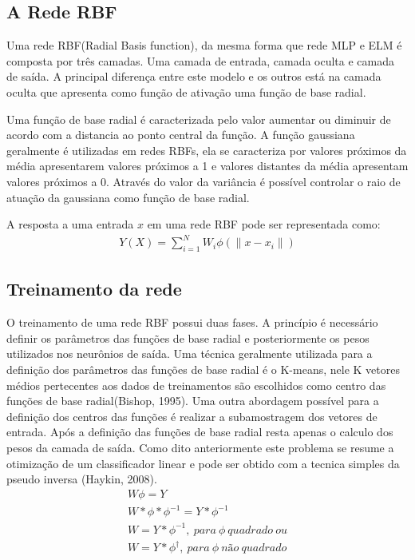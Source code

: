\documentclass[
	article,			%
	11pt,				%
	oneside,			%
	a4paper,			%
	english,			%
	brazil,				%
	sumario=tradicional
	]{abntex2}
\begin{document}
\subsection{A Rede RBF}
Uma rede RBF(Radial Basis function), da mesma forma que rede MLP e ELM é
composta por três camadas.
Uma camada de entrada, camada oculta e camada de saída. A principal diferença entre
este modelo e os outros está na camada oculta que apresenta como função de
ativação uma função de base radial.

Uma função de base radial é caracterizada pelo valor aumentar ou
diminuir de acordo com a distancia ao ponto central da função. A função
gaussiana geralmente é utilizadas em redes RBFs, ela se caracteriza por valores
próximos da média apresentarem valores próximos a 1 e valores distantes da média
apresentam valores próximos a 0. Através do valor da variância é
possível controlar o raio de atuação da gaussiana como função de base
radial.

A resposta a uma entrada $x$ em uma rede RBF pode ser representada como:
\begin{align}
Y(X)=\sum^{N}_{i=1}W_i\phi(\|x-x_i\|)
\end{align}

\subsection{Treinamento da rede}
O treinamento de uma rede RBF possui duas fases. A princípio é necessário
definir os parâmetros das funções de base radial e posteriormente os pesos
utilizados nos neurônios de saída. Uma técnica geralmente utilizada para a
definição dos parâmetros das funções de base radial é o K-means, nele K
vetores médios pertecentes aos dados de treinamentos são escolhidos como centro
das funções de base radial(Bishop, 1995). Uma outra abordagem possível para a
definição dos centros das funções é realizar a subamostragem dos vetores de
entrada. Após a definição das funções de base radial resta apenas o calculo dos
pesos da camada de saída. Como dito anteriormente este problema se resume a
otimização de um classificador linear e pode ser obtido com a tecnica simples
da pseudo inversa (Haykin, 2008).
\begin{align}
W\phi=Y \\
W*\phi*\phi^{-1}=Y*\phi^{-1}\\
W=Y*\phi^{-1},\ para\ \phi\ quadrado\ ou \\
W=Y*\phi^{\dagger},\ para\ \phi\ não\ quadrado
\end{align}
\end{document}
